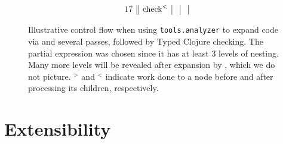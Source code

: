 \begin{figure}
$$\begin{array}{r||l|l|l|}
     17         & \text{\clj{check}}^{<}      &                             &                      \\
  \end{array}
$$
  \caption{Illustrative control flow when
  using \texttt{tools.analyzer} to expand code via  and several passes,
  followed by Typed Clojure checking.
  The partial expression 
  was chosen since it has at least 3 levels of nesting.
  Many more levels will be revealed after expansion by , which we do not picture.
  ${}^>$ and ${}^<$ indicate work done to a node before and after processing its children, respectively.
  }
  \label{fig:analyzer:control-flow-pre-expand}
\end{figure}

\section{Extensibility}

